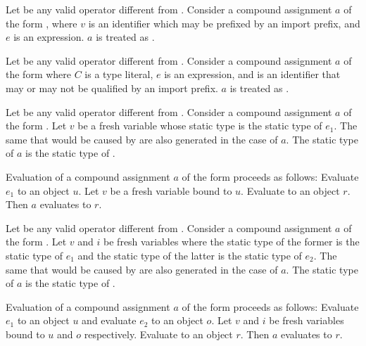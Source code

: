 \documentclass[makeidx]{article}
\begin{document}
{\LMHash{}%
Let \op{} be any valid operator different from .
Consider a compound assignment $a$ of the form ,
where $v$ is an identifier which may be prefixed by an import prefix,
and $e$ is an expression.
$a$ is treated as .
\EndCase

\LMHash{}%
Let \op{} be any valid operator different from .
Consider a compound assignment $a$
of the form 
where $C$ is a type literal, $e$ is an expression, and
\id{} is an identifier that may or may not be qualified by an import prefix.
$a$ is treated as .
\EndCase

\LMHash{}%
Let \op{} be any valid operator different from .
Consider a compound assignment $a$
of the form .
Let $v$ be a fresh variable whose static type is the static type of $e_1$.
The same  that would be caused by
are also generated in the case of $a$.
The static type of $a$ is the static type of
.

\LMHash{}%
Evaluation of a compound assignment $a$
of the form 
proceeds as follows:
Evaluate $e_1$ to an object $u$.
Let $v$ be a fresh variable bound to $u$.
Evaluate  to an object $r$.
Then $a$ evaluates to $r$.
\EndCase

\LMHash{}%
Let \op{} be any valid operator different from .
Consider a compound assignment $a$
of the form .
Let $v$ and $i$ be fresh variables
where the static type of the former is the static type of $e_1$
and the static type of the latter is the static type of $e_2$.
The same  that would be caused by
are also generated in the case of $a$.
The static type of $a$ is the static type of
.

\LMHash{}%
Evaluation of a compound assignment $a$ of the form
proceeds as follows:
Evaluate $e_1$ to an object $u$ and evaluate $e_2$ to an object $o$.
Let $v$ and $i$ be fresh variables bound to $u$ and $o$ respectively.
Evaluate  to an object $r$.
Then $a$ evaluates to $r$.
\EndCase

}
\end{document}

